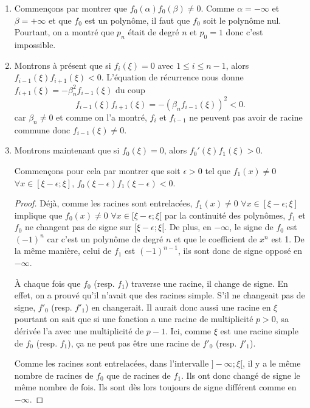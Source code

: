 \documentclass{article}
\begin{document}
\begin{enumerate}
  \item Commençons par montrer que $f_0(\alpha)f_0(\beta) \neq 0$.
    Comme $\alpha = -\infty$ et $\beta = + \infty$ et que $f_0$ est un polynôme,
    il faut que $f_0$ soit le polynôme nul.
    Pourtant, on a montré que $p_n$ était de degré $n$ et $p_0 = 1$ donc
    c'est impossible.
  \item Montrons à présent que si $f_i(\xi) = 0$ avec $1 \leq i \leq n-1$,
    alors $f_{i-1}(\xi)f_{i+1}(\xi) < 0$.
    L'équation de récurrence nous donne
    $f_{i+1}(\xi) = -\beta_n^2f_{i-1}(\xi)$ du coup
    \[ f_{i-1}(\xi)f_{i+1}(\xi) = -(\beta_nf_{i-1}(\xi))^2 < 0. \]
    car $\beta_n \neq 0$ et comme on l'a montré, $f_i$ et $f_{i-1}$ ne peuvent
    pas avoir de racine commune donc $f_{i-1}(\xi) \neq 0$.
  \item Montrons maintenant que si $f_0(\xi) = 0$,
    alors $f_0'(\xi)f_1(\xi) > 0$.

    Commençons pour cela par montrer que
    soit $\epsilon > 0$ tel que
    $f_1(x) \neq 0$ $\forall x \in [\xi - \epsilon; \xi]$,
    $f_0(\xi-\epsilon) f_1(\xi-\epsilon) < 0$.
    \begin{proof}
      Déjà, comme les racines sont entrelacées,
      $f_1(x) \neq 0$ $\forall x \in [\xi - \epsilon; \xi]$ implique que
      $f_0(x) \neq 0$ $\forall x \in [\xi - \epsilon; \xi[$
      par la continuité des polynômes, $f_1$ et $f_0$ ne changent pas
      de signe sur $[\xi - \epsilon; \xi[$.
      De plus, en $-\infty$,
      le signe de $f_0$ est $(-1)^n$ car c'est un polynôme de
      degré $n$ et que le coefficient de $x^n$ est 1.
      De la même manière, celui de $f_1$ est $(-1)^{n-1}$,
      ils sont donc de signe opposé en $-\infty$.

      À chaque fois que $f_0$ (resp. $f_1$) traverse une racine, il change
      de signe.
      En effet, on a prouvé qu'il n'avait que des racines simple.
      S'il ne changeait pas de signe, $f'_0$ (resp. $f'_1$) en changerait.
      Il aurait donc aussi une racine en $\xi$ pourtant on sait que si une
      fonction a une racine de multiplicité $p > 0$, sa
      dérivée l'a avec une multiplicité de $p-1$.
      Ici, comme $\xi$ est une racine simple de $f_0$ (resp. $f_1$), ça ne peut
      pas être une racine de $f'_0$ (resp. $f'_1$).

      Comme les racines sont entrelacées, dans l'intervalle
      $]-\infty; \xi[$, il y a le même nombre de racines de $f_0$ que de
      racines de $f_1$.
      Ils ont donc changé de signe le même nombre de fois.
      Ils sont dès lors toujours de signe différent comme en $-\infty$.
    \end{proof}


\end{enumerate}
\end{document}
